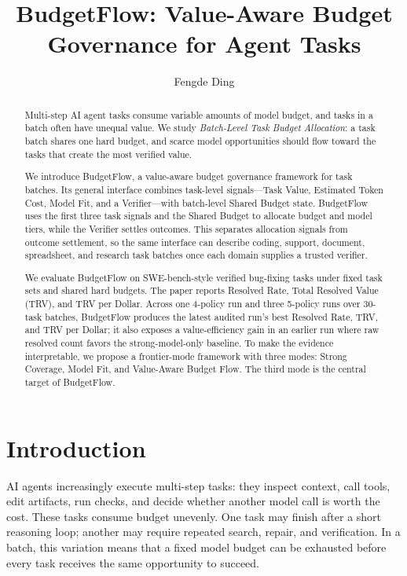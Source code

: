 \documentclass[sigconf,review,anonymous]{acmart}
\title{BudgetFlow: Value-Aware Budget Governance for Agent Tasks}
\author{Fengde Ding}
\affiliation{%
  \institution{University of International Relations}
  \country{China}
}
\newcommand{\method}{BudgetFlow\xspace}
\newcommand{\trv}{TRV\xspace}
\newcommand{\taskvalue}{Task Value\xspace}
\newcommand{\tokencost}{Estimated Token Cost\xspace}
\newcommand{\modelfit}{Model Fit\xspace}
\newcommand{\sharedbudget}{Shared Budget\xspace}
\newcommand{\verifier}{Verifier\xspace}
\begin{document}
\begin{abstract}
Multi-step AI agent tasks consume variable amounts of model budget, and tasks in a batch often have unequal value. We study \emph{Batch-Level Task Budget Allocation}: a task batch shares one hard budget, and scarce model opportunities should flow toward the tasks that create the most verified value.

We introduce \method, a value-aware budget governance framework for task batches. Its general interface combines task-level signals---\taskvalue, \tokencost, \modelfit, and a \verifier---with batch-level \sharedbudget state. \method uses the first three task signals and the \sharedbudget to allocate budget and model tiers, while the \verifier settles outcomes. This separates allocation signals from outcome settlement, so the same interface can describe coding, support, document, spreadsheet, and research task batches once each domain supplies a trusted verifier.

We evaluate \method on SWE-bench-style verified bug-fixing tasks under fixed task sets and shared hard budgets. The paper reports Resolved Rate, Total Resolved Value (\trv), and \trv per Dollar. Across one 4-policy run and three 5-policy runs over 30-task batches, \method produces the latest audited run's best Resolved Rate, \trv, and \trv per Dollar; it also exposes a value-efficiency gain in an earlier run where raw resolved count favors the strong-model-only baseline. To make the evidence interpretable, we propose a frontier-mode framework with three modes: Strong Coverage, Model Fit, and Value-Aware Budget Flow. The third mode is the central target of \method.
\end{abstract}

\maketitle

\section{Introduction}
AI agents increasingly execute multi-step tasks: they inspect context, call tools, edit artifacts, run checks, and decide whether another model call is worth the cost. These tasks consume budget unevenly. One task may finish after a short reasoning loop; another may require repeated search, repair, and verification. In a batch, this variation means that a fixed model budget can be exhausted before every task receives the same opportunity to succeed.
\end{document}

